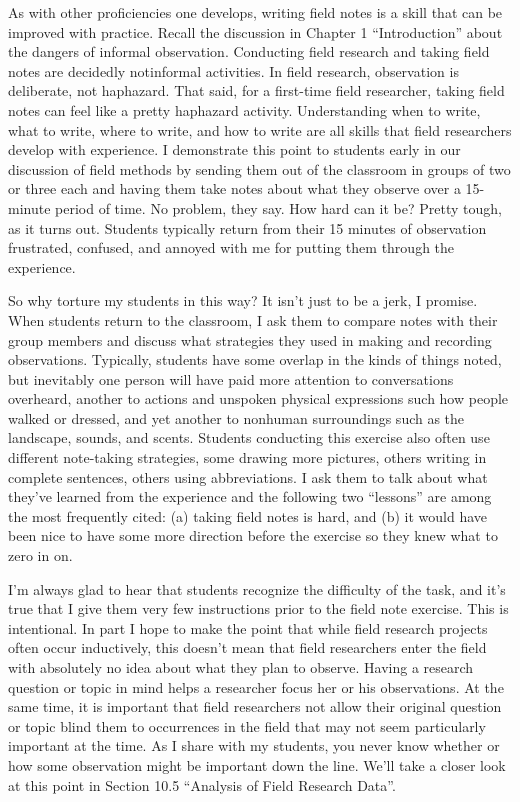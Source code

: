 As with other proficiencies one develops, writing field notes is a skill that can be improved with practice. Recall the discussion in Chapter 1 ``Introduction'' about the dangers of informal observation. Conducting field research and taking field notes are decidedly notinformal activities. In field research, observation is deliberate, not haphazard. That said, for a first-time field researcher, taking field notes can feel like a pretty haphazard activity. Understanding when to write, what to write, where to write, and how to write are all skills that field researchers develop with experience. I demonstrate this point to students early in our discussion of field methods by sending them out of the classroom in groups of two or three each and having them take notes about what they observe over a 15-minute period of time. No problem, they say. How hard can it be? Pretty tough, as it turns out. Students typically return from their 15 minutes of observation frustrated, confused, and annoyed with me for putting them through the experience.

So why torture my students in this way? It isn’t just to be a jerk, I promise. When students return to the classroom, I ask them to compare notes with their group members and discuss what strategies they used in making and recording observations. Typically, students have some overlap in the kinds of things noted, but inevitably one person will have paid more attention to conversations overheard, another to actions and unspoken physical expressions such how people walked or dressed, and yet another to nonhuman surroundings such as the landscape, sounds, and scents. Students conducting this exercise also often use different note-taking strategies, some drawing more pictures, others writing in complete sentences, others using abbreviations. I ask them to talk about what they’ve learned from the experience and the following two ``lessons'' are among the most frequently cited: (a) taking field notes is hard, and (b) it would have been nice to have some more direction before the exercise so they knew what to zero in on.

I’m always glad to hear that students recognize the difficulty of the task, and it’s true that I give them very few instructions prior to the field note exercise. This is intentional. In part I hope to make the point that while field research projects often occur inductively, this doesn’t mean that field researchers enter the field with absolutely no idea about what they plan to observe. Having a research question or topic in mind helps a researcher focus her or his observations. At the same time, it is important that field researchers not allow their original question or topic blind them to occurrences in the field that may not seem particularly important at the time. As I share with my students, you never know whether or how some observation might be important down the line. We’ll take a closer look at this point in Section 10.5 ``Analysis of Field Research Data''.

